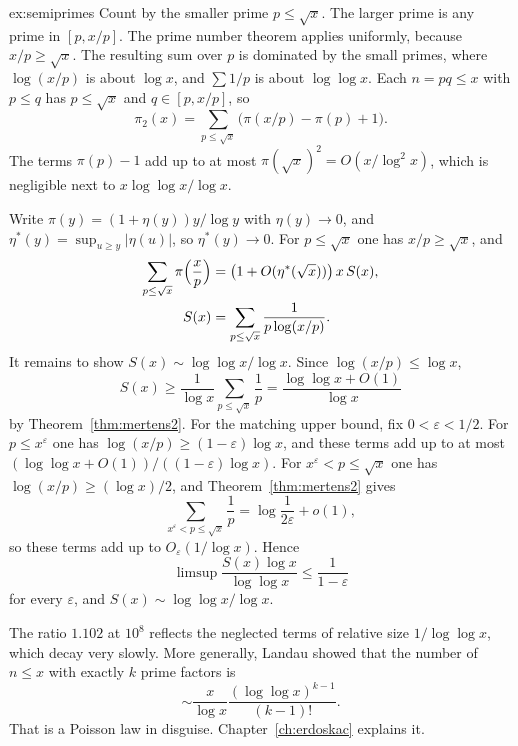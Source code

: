 \begin{solution}{ex:semiprimes}
\idea Count by the smaller prime $p\le\sqrt x$. The larger prime is any prime in $[p,x/p]$. The prime number theorem applies uniformly, because $x/p\ge\sqrt x$. The resulting sum over $p$ is dominated by the small primes, where $\log(x/p)$ is about $\log x$, and $\sum 1/p$ is about $\log\log x$.
\writeup Each $n=pq\le x$ with $p\le q$ has $p\le\sqrt x$ and $q\in[p,x/p]$, so
\[
\pi_2(x)=\sum_{p\le\sqrt x}\bigl(\pi(x/p)-\pi(p)+1\bigr).
\]
The terms $\pi(p)-1$ add up to at most $\pi(\sqrt x)^2=O(x/\log^2x)$, which is negligible next to $x\log\log x/\log x$.

Write $\pi(y)=(1+\eta(y))y/\log y$ with $\eta(y)\to0$, and $\eta^*(y)=\sup_{u\ge y}|\eta(u)|$, so $\eta^*(y)\to0$. For $p\le\sqrt x$ one has $x/p\ge\sqrt x$, and
\[
\begin{aligned}\sum_{p\le\sqrt x}\pi\Bigl(\frac xp\Bigr)&=\bigl(1+O(\eta^*(\sqrt x))\bigr)\,x\,S(x),\\
S(x)&=\sum_{p\le\sqrt x}\frac1{p\log(x/p)}.\end{aligned}
\]
It remains to show $S(x)\sim\log\log x/\log x$. Since $\log(x/p)\le\log x$,
\[
S(x)\ge\frac1{\log x}\sum_{p\le\sqrt x}\frac1p=\frac{\log\log x+O(1)}{\log x}
\]
by Theorem~\ref{thm:mertens2}. For the matching upper bound, fix $0<\varepsilon<1/2$. For $p\le x^\varepsilon$ one has $\log(x/p)\ge(1-\varepsilon)\log x$, and these terms add up to at most $(\log\log x+O(1))/((1-\varepsilon)\log x)$. For $x^\varepsilon<p\le\sqrt x$ one has $\log(x/p)\ge(\log x)/2$, and Theorem~\ref{thm:mertens2} gives
\[
\sum_{x^\varepsilon<p\le\sqrt x}\frac1p=\log\frac1{2\varepsilon}+o(1),
\]
so these terms add up to $O_\varepsilon(1/\log x)$. Hence
\[
\limsup\frac{S(x)\log x}{\log\log x}\le\frac1{1-\varepsilon}
\]
for every $\varepsilon$, and $S(x)\sim\log\log x/\log x$.

The ratio $1.102$ at $10^8$ reflects the neglected terms of relative size $1/\log\log x$, which decay very slowly. More generally, Landau showed that the number of $n\le x$ with exactly $k$ prime factors is
\[
\sim\frac x{\log x}\frac{(\log\log x)^{k-1}}{(k-1)!}.
\]
That is a Poisson law in disguise. Chapter~\ref{ch:erdoskac} explains it.
\end{solution}


